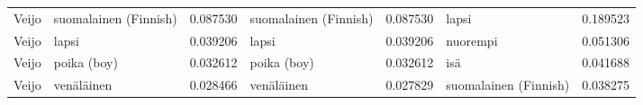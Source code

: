 \begin{tabular}{llrlrlr}
 Veijo &     suomalainen (Finnish) &                         0.087530 &     suomalainen (Finnish) &                              0.087530 &                 lapsi &                        0.189523 \\
 Veijo &                     lapsi &                         0.039206 &                     lapsi &                              0.039206 &              nuorempi &                        0.051306 \\
 Veijo &               poika (boy) &                         0.032612 &               poika (boy) &                              0.032612 &                   isä &                        0.041688 \\
 Veijo &                venäläinen &                         0.028466 &                venäläinen &                              0.027829 & suomalainen (Finnish) &                        0.038275 \\
\bottomrule
\end{tabular}
